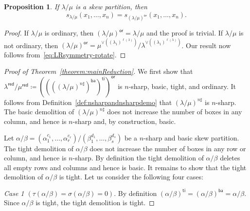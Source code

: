 \documentclass[10pt]{article}
\newtheorem{prop}[theorem]{Proposition}
\theoremstyle{definition}
\newcommand{\ba}{\mathsf{ba}}
\newcommand{\red}{\mathsf{red}}
\newcommand{\ti}{\mathsf{ti}}
\newcommand{\orsf}{\mathsf{or}}
\let\hypertargeta\hypertarget %
\newenvironment{Case}[1]{\par\vskip2pt\noindent%
\emph{#1}.}{\vskip2pt}
\begin{document}
\begin{prop}
\label{prop:reductionordinary}
If $\lambda / \mu$ is a skew partition, then 
\[
s_{\lambda / \mu}(x_1,\ldots,x_n) = s_{(\lambda / \mu)^{\orsf}}(x_1,\ldots,x_n).
\]
\end{prop}
\goodbreak
\begin{proof}
If $\lambda / \mu$ is ordinary, then $(\lambda / \mu)^{\orsf}=\lambda / \mu$ and the proof is trivial. If $\lambda / \mu$ is not ordinary, then $(\lambda / \mu)^{\orsf}= \mu^{\vee((\lambda_1)^{\ell(\lambda)})} / \lambda^{\vee((\lambda_1)^{\ell(\lambda)})}$. Our result now follows from~\eqref{eq:LRsymmetry-rotate}.%
\end{proof}

\begin{proof}[Proof of Theorem~\ref{theorem:mainReduction}]
We first show that $\lambda^{\red} / \mu^{\red} \coloneqq ((((\lambda / \mu)^{n\sharp})^{\ba })^{\ti })^{\orsf}$ is $n$-sharp, basic, tight, and ordinary. It follows from Definition~\ref{def:nsharpandnsharpdemo} that $(\lambda / \mu)^{n\sharp}$ is $n$-sharp. The basic demolition of $(\lambda / \mu)^{n\sharp}$ does not increase the number of boxes in any column, and hence is $n$-sharp and, by construction, basic.

Let $\alpha / \beta = (\alpha_1^{c_1},\ldots,\alpha_r^{c_r}) / (\beta_1^{d_1},\ldots,\beta_s^{d_s})$ be a $n$-sharp and basic skew partition. The tight demolition of $\alpha / \beta$ does not increase the number of boxes in any row or column, and hence is $n$-sharp. By definition the tight demolition of $\alpha / \beta$ deletes all empty rows and columns and hence is basic. It remains to show that the tight demolition of $\alpha / \beta$ is tight. Let us consider the following four cases:

\begin{Case}
{\hypertargeta{theo1.9case_1}{Case 1} $(\tau(\alpha/\beta) = \sigma(\alpha/\beta) = 0)$} By definition $(\alpha/\beta)^{\ti} = (\alpha/\beta)^{\ba} = \alpha/\beta$. Since $\alpha/\beta$ is tight, the tight demolition is tight. 
\end{Case}


\end{proof}
\end{document}
